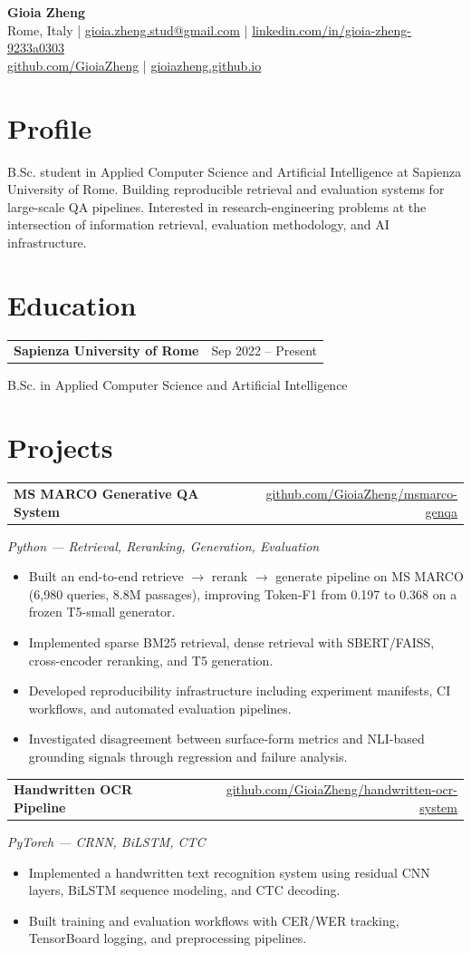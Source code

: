 \documentclass[10pt,a4paper]{article}
\makeatletter
\newcommand{\resheading}[1]{\section*{#1}}
\newcommand{\resitem}[2]{
  \vspace{2pt}
  \begin{tabular*}{\textwidth}{@{}l@{\extracolsep{\fill}}r@{}}
    \textbf{#1} & #2 \\
  \end{tabular*}
}
\newcommand{\ressubitem}[1]{
  \textit{#1}\vspace{-2pt}
}
\makeatother
\begin{document}
\begin{center}
{\Large \textbf{Gioia Zheng}} \\[2pt]
Rome, Italy \quad | \quad
\href{mailto:gioia.zheng.stud@gmail.com}{gioia.zheng.stud@gmail.com} \quad | \quad
\href{https://www.linkedin.com/in/gioia-zheng-9233a0303}{linkedin.com/in/gioia-zheng-9233a0303} \\[1pt]
\href{https://github.com/GioiaZheng}{github.com/GioiaZheng} \quad | \quad
\href{https://gioiazheng.github.io}{gioiazheng.github.io}
\end{center}

\vspace{-7pt}

\resheading{Profile}
B.Sc. student in Applied Computer Science and Artificial Intelligence at Sapienza University of Rome. Building reproducible retrieval and evaluation systems for large-scale QA pipelines. Interested in research-engineering problems at the intersection of information retrieval, evaluation methodology, and AI infrastructure.

\resheading{Education}
\resitem{Sapienza University of Rome}{Sep 2022 -- Present}
B.Sc. in Applied Computer Science and Artificial Intelligence

\resheading{Projects}

\resitem{MS MARCO Generative QA System}{\href{https://github.com/GioiaZheng/msmarco-genqa}{github.com/GioiaZheng/msmarco-genqa}}
\ressubitem{Python --- Retrieval, Reranking, Generation, Evaluation}
\begin{itemize}
\item Built an end-to-end retrieve $\rightarrow$ rerank $\rightarrow$ generate pipeline on MS MARCO (6,980 queries, 8.8M passages), improving Token-F1 from 0.197 to 0.368 on a frozen T5-small generator.
\item Implemented sparse BM25 retrieval, dense retrieval with SBERT/FAISS, cross-encoder reranking, and T5 generation.
\item Developed reproducibility infrastructure including experiment manifests, CI workflows, and automated evaluation pipelines.
\item Investigated disagreement between surface-form metrics and NLI-based grounding signals through regression and failure analysis.
\end{itemize}

\resitem{Handwritten OCR Pipeline}{\href{https://github.com/GioiaZheng/handwritten-ocr-system}{github.com/GioiaZheng/handwritten-ocr-system}}
\ressubitem{PyTorch --- CRNN, BiLSTM, CTC}
\begin{itemize}
\item Implemented a handwritten text recognition system using residual CNN layers, BiLSTM sequence modeling, and CTC decoding.
\item Built training and evaluation workflows with CER/WER tracking, TensorBoard logging, and preprocessing pipelines.
\end{itemize}
\end{document}
